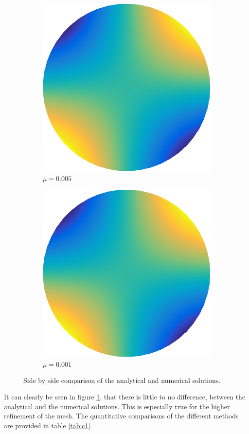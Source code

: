 \documentclass[../fem.tex]{subfile}
\begin{document}
\begin{figure}[htpb]
\begin{subfigure}{0.4\textwidth}
    \includegraphics[width=0.8\linewidth]{figures/c1c/approx.png}
    \caption{$\mu=0.005$}
  \end{subfigure}
  \begin{subfigure}{0.4\textwidth}
    \centering
    \includegraphics[width=0.8\linewidth]{figures/c1d/approx.png}
    \caption{$\mu=0.001$}
  \end{subfigure}
  \caption{Side by side comparison of the analytical and numerical solutions.}
  \label{fig:d1_soln}
\end{figure}

It can clearly be seen in figure \ref{fig:d1_soln}, that there is little to no
difference, between the analytical and the numerical solutions. This is
especially true for the higher refinement of the mesh. The quantitative
comparisons of the different methods are provided in table
\ref{tab:c1}.
\end{document}
